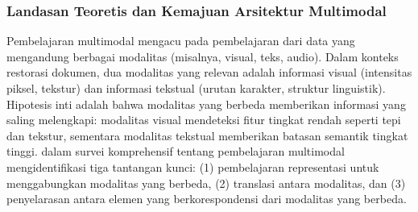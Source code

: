 \subsubsection{Landasan Teoretis dan Kemajuan Arsitektur Multimodal}
\label{subsubsec:theoretical-foundation-multimodal}
Pembelajaran multimodal mengacu pada pembelajaran dari data yang mengandung berbagai modalitas (misalnya, visual, teks, audio). Dalam konteks restorasi dokumen, dua modalitas yang relevan adalah informasi visual (intensitas piksel, tekstur) dan informasi tekstual (urutan karakter, struktur linguistik). Hipotesis inti adalah bahwa modalitas yang berbeda memberikan informasi yang saling melengkapi: modalitas visual mendeteksi fitur tingkat rendah seperti tepi dan tekstur, sementara modalitas tekstual memberikan batasan semantik tingkat tinggi. \parencite{baltrusaitis2019} dalam survei komprehensif tentang pembelajaran multimodal mengidentifikasi tiga tantangan kunci: (1) pembelajaran representasi untuk menggabungkan modalitas yang berbeda, (2) translasi antara modalitas, dan (3) penyelarasan antara elemen yang berkorespondensi dari modalitas yang berbeda.
